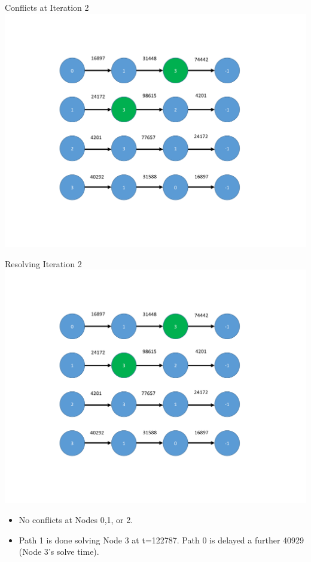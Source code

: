 \documentclass[xcolor={usenames,dvipsnames,svgnames,table}]{beamer}
\begin{document}
\begin{frame}[t]{Conflicts at Iteration 2}
\centering
\includegraphics[trim={2cm 2cm 4cm 2cm},clip,scale=0.45]{figures/iteration2_conflicts.pdf}
\end{frame}

\begin{frame}[t]{Resolving Iteration 2}
\centering
\includegraphics[trim={2cm 2cm 4cm 2cm},clip,scale=0.2]{figures/iteration2_conflicts.pdf}
\begin{block}{}
\begin{itemize}
	\item No conflicts at Nodes 0,1, or 2.
	\item Path 1 is done solving Node 3 at t=122787. Path 0 is delayed a further 40929 (Node 3's solve time).
\end{itemize}
\end{block}
\end{frame}
\end{document}
